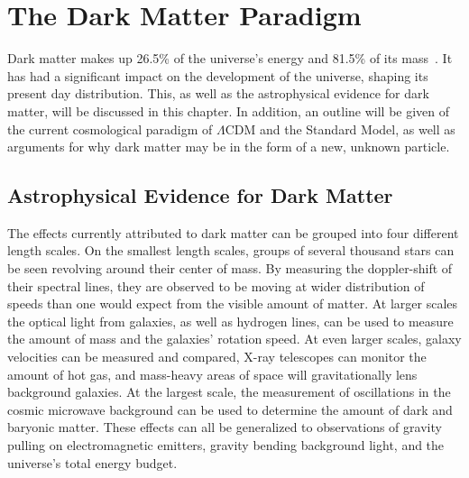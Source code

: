 \cleartooddpage[\thispagestyle{empty}]
\newcommand{\thetamc}{\theta_{\textrm{MC}}}
\newcommand{\mlratio}{$\left [ \frac{\textrm{M}_\odot}{\textrm{L}_\odot} \right ]$}
\chapter{The Dark Matter Paradigm}\label{ch_dm}

Dark matter makes up 26.5\% of the universe's energy and 81.5\% of its mass~\cite{planck2015}.
It has had a significant impact on the development of the universe, shaping its present day distribution.
This, as well as the astrophysical evidence for dark matter, will be discussed in this chapter.
In addition, an outline will be given of the current cosmological paradigm of $\Lambda$CDM and the Standard Model, as well as arguments for why dark matter may be in the form of a new, unknown particle.



\section{Astrophysical Evidence for Dark Matter}
  
The effects currently attributed to dark matter can be grouped into four different length scales.
On the smallest length scales, groups of several thousand stars can be seen revolving around their center of mass.
By measuring the doppler-shift of their spectral lines, they are observed to be moving at wider distribution of speeds than one would expect from the visible amount of matter.
At larger scales the optical light from galaxies, as well as hydrogen lines, can be used to measure the amount of mass and the galaxies' rotation speed.
At even larger scales, galaxy velocities can be measured and compared, X-ray telescopes can monitor the amount of hot gas, and mass-heavy areas of space will gravitationally lens background galaxies.
At the largest scale, the measurement of oscillations in the cosmic microwave background can be used to determine the amount of dark and baryonic matter.
These effects can all be generalized to observations of gravity pulling on electromagnetic emitters, gravity bending background light, and the universe's total energy budget.

